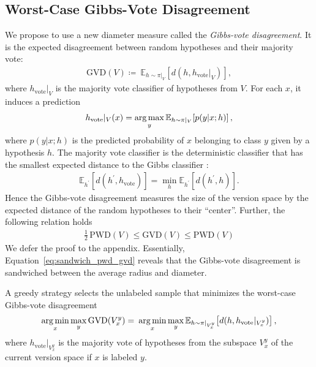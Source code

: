 \documentclass[runningheads, envcountsame, a4paper]{llncs}
\newcommand{\argmax}{\operatornamewithlimits{arg\,max}}
\newcommand{\argmin}{\operatornamewithlimits{arg\,min}}
\begin{document}
\subsection{Worst-Case Gibbs-Vote Disagreement}
\label{sec:worst_case_gibbs_vote_disagreement}
We propose to use a new diameter measure called the \textit{Gibbs-vote disagreement}. It is the expected disagreement between random hypotheses and their majority vote:
\begin{align}
    \text{GVD}(V) \coloneqq\: \mathbb{E}_{h \sim \pi|_V}\! \left[ d(h, h_{\text{vote}}|_V) \right],
\end{align}
where $h_{\text{vote}}|_V$ is the majority vote classifier of hypotheses from $V$. For each $x$, it induces a prediction
\begin{align}
    h_{\text{vote}}|_V(x) = \argmax_y \mathbb{E}_{h \sim \pi|_V}\! \left[ p(y|x; h) \right],
\end{align}
where $p(y|x;h)$ is the predicted probability of $x$ belonging to class $y$ given by a hypothesis $h$.
The majority vote classifier is the deterministic classifier that has the smallest expected distance to the Gibbs classifier \cite{Kaariainen05,Devroye13}:
\begin{align}
    \mathbb{E}_{h^\prime} \left[ d(h^\prime, h_{\text{vote}}) \right] = \min_h \mathbb{E}_{h^\prime}\! \left[ d(h^\prime, h) \right].
\end{align}
Hence the Gibbs-vote disagreement measures the size of the version space by the expected distance of the random hypotheses to their ``center''. Further, the following relation holds
\begin{align}
    \frac{1}{2}\, \text{PWD}(V) \le \text{GVD}(V) \le \text{PWD}(V)
    \label{eq:sandwich_pwd_gvd}
\end{align}
We defer the proof to the appendix. Essentially, Equation~\eqref{eq:sandwich_pwd_gvd} reveals that the Gibbs-vote disagreement is sandwiched between the average radius and diameter.

A greedy strategy selects the unlabeled sample that minimizes the worst-case Gibbs-vote disagreement
\begin{align}
    \argmin_x \max_y \text{GVD}(V_x^y) =\: \argmin_x \max_y \mathbb{E}_{h \sim \pi|_{V_x^y}}\! \left[ d(h, h_{\text{vote}}|_{V_x^y}) \right],
\end{align}
where $h_{\text{vote}}|_{V_x^y}$ is the majority vote of hypotheses from the subspace $V_x^y$ of the current version space if $x$ is labeled $y$.
\end{document}
